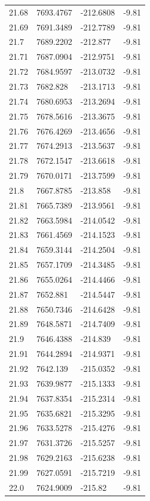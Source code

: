 \begin{table}[H]
\begin{tabular}{llll}
21.68 & 7693.4767 & -212.6808 & -9.81 \\
21.69 & 7691.3489 & -212.7789 & -9.81 \\
21.7 & 7689.2202 & -212.877 & -9.81 \\
21.71 & 7687.0904 & -212.9751 & -9.81 \\
21.72 & 7684.9597 & -213.0732 & -9.81 \\
21.73 & 7682.828 & -213.1713 & -9.81 \\
21.74 & 7680.6953 & -213.2694 & -9.81 \\
21.75 & 7678.5616 & -213.3675 & -9.81 \\
21.76 & 7676.4269 & -213.4656 & -9.81 \\
21.77 & 7674.2913 & -213.5637 & -9.81 \\
21.78 & 7672.1547 & -213.6618 & -9.81 \\
21.79 & 7670.0171 & -213.7599 & -9.81 \\
21.8 & 7667.8785 & -213.858 & -9.81 \\
21.81 & 7665.7389 & -213.9561 & -9.81 \\
21.82 & 7663.5984 & -214.0542 & -9.81 \\
21.83 & 7661.4569 & -214.1523 & -9.81 \\
21.84 & 7659.3144 & -214.2504 & -9.81 \\
21.85 & 7657.1709 & -214.3485 & -9.81 \\
21.86 & 7655.0264 & -214.4466 & -9.81 \\
21.87 & 7652.881 & -214.5447 & -9.81 \\
21.88 & 7650.7346 & -214.6428 & -9.81 \\
21.89 & 7648.5871 & -214.7409 & -9.81 \\
21.9 & 7646.4388 & -214.839 & -9.81 \\
21.91 & 7644.2894 & -214.9371 & -9.81 \\
21.92 & 7642.139 & -215.0352 & -9.81 \\
21.93 & 7639.9877 & -215.1333 & -9.81 \\
21.94 & 7637.8354 & -215.2314 & -9.81 \\
21.95 & 7635.6821 & -215.3295 & -9.81 \\
21.96 & 7633.5278 & -215.4276 & -9.81 \\
21.97 & 7631.3726 & -215.5257 & -9.81 \\
21.98 & 7629.2163 & -215.6238 & -9.81 \\
21.99 & 7627.0591 & -215.7219 & -9.81 \\
22.0 & 7624.9009 & -215.82 & -9.81 \\

\end{tabular}
\end{table}
